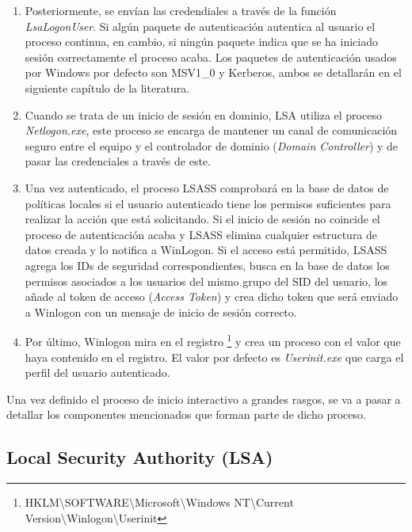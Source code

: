 \begin{enumerate}
\item Posteriormente, se envían las credendiales a través de la función {\it LsaLogonUser}. Si algún paquete de autenticación autentica al usuario el proceso continua, en cambio, si ningún paquete indica que se ha iniciado sesión correctamente el proceso acaba. Los paquetes de autenticación usados por Windows por defecto son MSV1\_0 y Kerberos, ambos se detallarán en el siguiente capítulo de la literatura. 

\item Cuando se trata de un inicio de sesión en dominio, LSA utiliza el proceso {\it Netlogon.exe}, este proceso se encarga de mantener un canal de comunicación seguro entre el equipo y el controlador de dominio ({\it Domain Controller}) y de pasar las credenciales a través de este. 

\item Una vez autenticado, el proceso LSASS comprobará en la base de datos de políticas locales si el usuario autenticado tiene los permisos suficientes para realizar la acción que está solicitando. Si el inicio de sesión no coincide el proceso de autenticación acaba y LSASS elimina cualquier estructura de datos creada y lo notifica a WinLogon. Si el acceso está permitido, LSASS agrega los IDs de seguridad correspondientes, busca en la base de datos los permisos asociados a los usuarios del mismo grupo del SID del usuario, los añade al token de acceso ({\it Access Token}) y crea dicho token que será enviado a Winlogon con un mensaje de inicio de sesión correcto. 

\item Por último, Winlogon mira en el registro \footnote{HKLM\textbackslash{}SOFTWARE\textbackslash{}Microsoft\textbackslash{}Windows NT\textbackslash{}Current Version\textbackslash{}Winlogon\textbackslash{}Userinit} y crea un proceso con el valor que haya contenido en el registro. El valor por defecto es {\it Userinit.exe} que carga el perfil del usuario autenticado. 

\end{enumerate}

Una vez definido el proceso de inicio interactivo a grandes rasgos, se va a pasar a detallar los componentes mencionados que forman parte de dicho proceso.

\subsection{Local Security Authority (LSA)}

